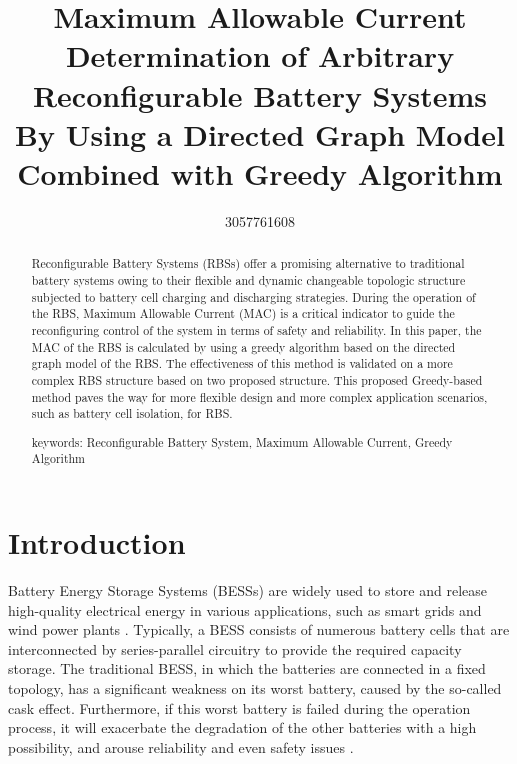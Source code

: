 \documentclass{article}
\title{Maximum Allowable Current Determination of Arbitrary Reconfigurable Battery Systems By Using a Directed Graph Model Combined with Greedy Algorithm}
\author{3057761608 }
\begin{document}
\maketitle

\begin{abstract} %
    Reconfigurable Battery Systems (RBSs) offer a promising alternative to traditional battery systems owing to their flexible and dynamic changeable topologic structure subjected to battery cell charging and discharging strategies. 
    During the operation of the RBS, Maximum Allowable Current (MAC) is a critical indicator to guide the reconfiguring control of the system in terms of safety and reliability. 
    In this paper, the MAC of the RBS is calculated by using a greedy algorithm based on the directed graph model of the RBS. %
    The effectiveness of this method is validated on a more complex RBS structure based on two proposed structure. 
    This proposed Greedy-based method paves the way for more flexible design and more complex application scenarios, such as battery cell isolation, for RBS.

    keywords:  Reconfigurable Battery System, Maximum Allowable Current, Greedy Algorithm
\end{abstract}

\section{Introduction}

Battery Energy Storage Systems (BESSs) are widely used to store and release high-quality electrical energy in various applications, such as smart grids and wind power plants \cite{desiqueiraControlStrategySmooth2021,karandehTwoStageAlgorithmOptimal2019,yangBatteryEnergyStorage2018,choCommercialResearchBattery2015}.
Typically, a BESS consists of numerous battery cells that are interconnected by series-parallel circuitry to provide the required capacity storage.
The traditional BESS, in which the batteries are connected in a fixed topology, has a significant weakness on its worst battery, caused by the so-called cask effect.
Furthermore, if this worst battery is failed during the operation process, it will exacerbate the degradation of the other batteries with a high possibility, and arouse reliability and even safety issues \cite{yangUnbalancedDischargingAging2016,fengPropagationMechanismsDiagnosis2019}.
\end{document}
